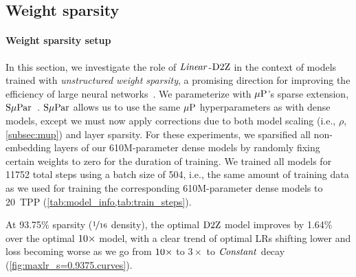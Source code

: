 \subsection{Weight sparsity}\label{subsec:sparsity}


\paragraph{Weight sparsity setup}

In this section, we investigate the role of $\mbox{\emph{Linear}}$-$\mbox{D2Z}$ in the
context of models trained with \emph{unstructured weight sparsity}, a
promising direction for improving the efficiency of large neural
networks~\citep{hoefler2021sparsity}.
%
We parameterize with $\mbox{$\mu$P}$'s sparse extension,
$\mbox{S$\mu$Par}$~\citep{dey2024sparse}.  $\mbox{S$\mu$Par}$ allows us to use the same
$\mbox{$\mu$P}$ hyperparameters as with dense models, except we must now apply
corrections due to both model scaling (i.e., $\rho$,
\cref{subsec:mup}) and layer sparsity.
%
For these experiments, we sparsified all non-embedding layers of our
610M-parameter dense models by randomly fixing certain weights to zero
for the duration of training.
%
We trained all models for 11752 total steps using a batch size of 504,
i.e., the same amount of training data as we used for training the
corresponding 610M-parameter dense models to 20~TPP\@
(\cref{tab:model_info,tab:train_steps}).



At 93.75\% sparsity ($\nicefrac{1}{16}$ density), the optimal $\mbox{D2Z}$
model improves by 1.64\% over the optimal $\mbox{10}\times$ model, with a clear
trend of optimal LRs shifting lower and loss becoming worse as we go
from $\mbox{10}\times$ to $3\times$ to $\mbox{\emph{Constant}}$ decay
(\cref{fig:maxlr_s=0.9375.curves}).

\begin{figure}
\noindent %
\begin{minipage}[b]{0.49\textwidth}
  \centering

\end{minipage}%
\hfill %
\begin{minipage}[b]{0.49\textwidth}
  \centering
  
\end{minipage}
\end{figure}

